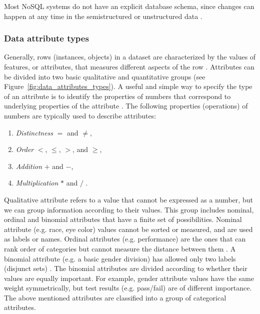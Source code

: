 				Most NoSQL systems  do not have an explicit database schema, since changes can happen at any time in the semistructured or unstructured data \cite{AndreasMeier2019}.	
													
			\subsubsection{Data attribute types}
			\label{subsec:data_attribute_types}
										
						
				Generally, rows (instances, objects) in a dataset are characterized by the values of features, or attributes, that measures different aspects of the row \cite{Orlando2015}. Attributes can be divided into two basic qualitative and quantitative groups (see Figure~\ref{fig:data_attributes_types}). A useful and simple way to specify the type of an attribute is to identify the properties of numbers that correspond to underlying properties of the attribute \cite{Tan2013}. The following properties (operations) of numbers are typically used to describe attributes:
				
				\begin{enumerate}
					\item \textit{Distinctness} $=$ and $\neq$,
					\item \textit{Order} $<$, $\leq$, $>$, and $\geq$,
					\item \textit{Addition} $+$ and $-$,
					\item \textit{Multiplication} $\ast$ and $/$ \cite{Tan2013}.
				\end{enumerate}
				
				Qualitative attribute refers to a value that cannot be expressed as a number, but we can group information according to their values. This group includes nominal, ordinal and binomial attributes that have a finite set of possibilities. Nominal attribute (e.g. race, eye color) values cannot be sorted or measured, and are used as labels or names. Ordinal attributes (e.g. performance) are the ones that can rank order of categories but cannot measure the distance between them \cite{Batini2006}. A binomial attribute (e.g. a basic gender division) has allowed only two labels (disjunct sets) \cite{Batini2006}. The binomial attributes are divided according to whether their values are equally important. For example, gender attribute values have the same weight symmetrically, but test results (e.g. pass/fail) are of different importance. The above mentioned attributes are classified into a group of categorical attributes.
				
